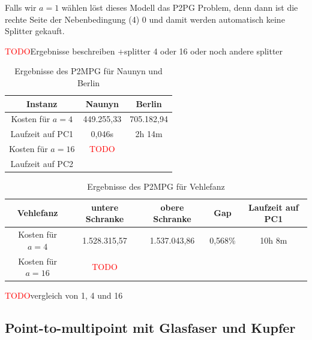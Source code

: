 \documentclass[11pt,a4paper]{article}
\newcommand{\TODO}{\textcolor{red}{TODO}}
\theoremstyle{my_th_style1}
\begin{document}
Falls wir $a=1$ w\"ahlen l\"ost dieses Modell das P2PG Problem, denn dann ist die rechte Seite der Nebenbedingung (4) 0 und damit werden automatisch keine Splitter gekauft.
 
 \TODO Ergebnisse beschreiben +splitter 4 oder 16 oder noch andere splitter
 \begin{table}[h]
 	\centering
 	\begin{tabular}{c|c|c}
 		Instanz & Naunyn & Berlin \\	
 		\hline
 		 Kosten für $a=4$ & 449.255,33 & 705.182,94 \\
 		 Laufzeit auf PC1 & 0,046s & 2h 14m \\
 		 \hline
 		Kosten für $a=16$ & \TODO & \\
 		Laufzeit auf PC2 &  & \\
 	\end{tabular}
 	\label{P2MPG}
 	\caption{Ergebnisse des P2MPG f\"ur Naunyn und Berlin} 
 \end{table}
 
 \begin{table}[h]
 	\centering
 	\begin{tabular}{c|c|c|c|c}
 		Vehlefanz & untere Schranke & obere Schranke & Gap & Laufzeit auf PC1\\	
 		\hline
 		 Kosten für $a=4$ & 1.528.315,57 & 1.537.043,86 & 0,568\% & 10h 8m\\
 		 \hline
 		Kosten für $a=16$ & \TODO &  & &  \\
 	\end{tabular}
 	\label{P2MPG}
 	\caption{Ergebnisse des P2MPG f\"ur Vehlefanz} 
 \end{table}
 \TODO vergleich von 1, 4 und 16 
 
\subsection{Point-to-multipoint mit Glasfaser und Kupfer}
\end{document}
